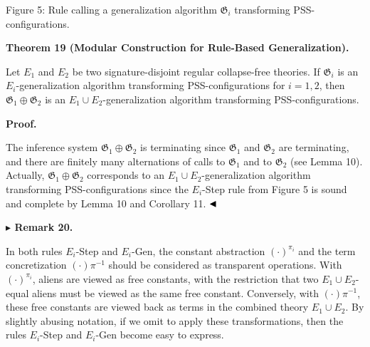 Figure 5: Rule calling a generalization algorithm $\mathfrak{G}_{i}$ transforming PSS-configurations.\par
 
 
 
\par\medskip\noindent\textbf{Theorem 19 (Modular Construction for Rule-Based Generalization).}\par
 
 
Let $E_{1}$ and $E_{2}$ be two signature-disjoint regular collapse-free theories. If $\mathfrak{G}_{i}$ is an $E_{i}$-generalization algorithm transforming PSS-configurations for $i=1,2$, then $\mathfrak{G}_{1}\oplus\mathfrak{G}_{2}$ is an $E_{1}\cup E_{2}$-generalization algorithm transforming PSS-configurations.\par
 
 
 
 
\par\medskip\noindent\textbf{Proof.}\par
 
 
The inference system $\mathfrak{G}_{1}\oplus\mathfrak{G}_{2}$ is terminating since $\mathfrak{G}_{1}$ and $\mathfrak{G}_{2}$ are terminating, and there are finitely many alternations of calls to $\mathfrak{G}_{1}$ and to $\mathfrak{G}_{2}$ (see Lemma 10). Actually, $\mathfrak{G}_{1}\oplus\mathfrak{G}_{2}$ corresponds to an $E_{1}\cup E_{2}$-generalization algorithm transforming PSS-configurations since the ${E_{i}}$-Step rule from Figure 5 is sound and complete by Lemma 10 and Corollary 11. $\hfill\blacktriangleleft$\par
 
 
 
\par\medskip\noindent\textbf{$\blacktriangleright$ Remark 20.}\par
 
 
In both rules $E_{i}$-Step and $E_{i}$-Gen, the constant abstraction $(\cdot)^{\pi_{i}}$ and the term concretization $(\cdot)\pi^{-1}$ should be considered as transparent operations. With $(\cdot)^{\pi_{i}}$, aliens are viewed as free constants, with the restriction that two $E_{1}\cup E_{2}$-equal aliens must be viewed as the same free constant. Conversely, with $(\cdot)\pi^{-1}$, these free constants are viewed back as terms in the combined theory $E_{1}\cup E_{2}$. By slightly abusing notation, if we omit to apply these transformations, then the rules $E_{i}$-Step and $E_{i}$-Gen become easy to express.\par
 
